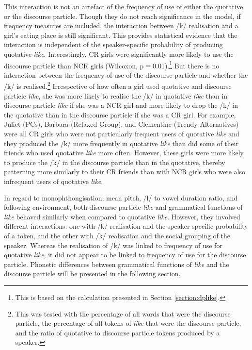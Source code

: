 This interaction is not an artefact of the frequency of use of either the quotative or the discourse particle. Though they do not reach significance in the model, if frequency measures are included, the interaction between /k/ realisation and a girl's eating place is still significant.  This provides statistical evidence that the interaction is independent of the speaker-specific probability of producing quotative \textit{like}.  Interestingly, CR girls were significantly more likely to use the discourse particle than NCR girls (Wilcoxon, p$=$0.01).\footnote{This is based on the calculation presented in Section \ref{section:dplike}.}  But there is no interaction between the frequency of use of the discourse particle and whether the /k/ is realised.\footnote{This was tested with the percentage of all words that were the discourse particle, the percentage of all tokens of \textit{like} that were the discourse particle, and the ratio of quotative to discourse particle tokens produced by a speaker.}  Irrespective of how often a girl used quotative and discourse particle \textit{like}, she was more likely to realise the /k/ in quotative \textit{like} than in discourse particle \textit{like} if she was a NCR girl and more likely to drop the /k/ in the quotative than in the discourse particle if she was a CR girl.  For example, Juliet (PCs), Barbara (Relaxed Group), and Clementine (Trendy Alternatives) were all CR girls who were not particularly frequent users of quotative \textit{like} and they produced the /k/ more frequently in quotative \textit{like} than did some of their friends who used quotative \textit{like} more often.  However, these girls were more likely to produce the /k/ in the discourse particle than in the quotative, thereby patterning more similarly to their CR friends than with NCR girls who were also infrequent users of quotative \textit{like}.  




In regard to monophthongisation, mean pitch, /l/ to vowel duration ratio, and following environment, both discourse particle \textit{like} and grammatical functions of \textit{like} behaved similarly when compared to quotative \textit{like}.  However, they involved different interactions: one with /k/ realisation and the speaker-specific probability of a token, and the other with /k/ realisation and the social grouping of the speaker.  Whereas the realisation of /k/ was linked to frequency of use for quotative \textit{like}, it did not appear to be linked to frequency of use for the discourse particle.  Phonetic differences between grammatical functions of \textit{like} and the discourse particle will be presented in the following section.

